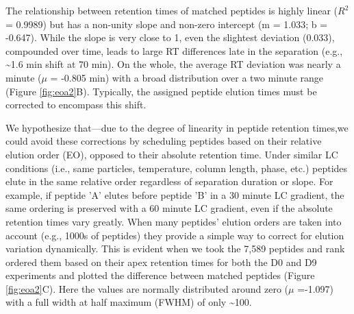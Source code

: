 The relationship between retention times of matched peptides is highly linear ($R^2$ = 0.9989) but has a non-unity slope and non-zero intercept (m = 1.033; b = -0.647). While the slope is very close to 1, even the slightest deviation (0.033), compounded over time, leads to large RT differences late in the separation (e.g., \textasciitilde1.6 min shift at 70 min). On the whole, the average RT deviation was nearly a minute ($\mu$ = -0.805 min) with a broad distribution over a two minute range (Figure \ref{fig:eoa2}B). Typically, the assigned peptide elution times must be corrected to encompass this shift.

We hypothesize that---due to the degree of linearity in peptide retention times,we could avoid these corrections by scheduling peptides based on their relative elution order (EO), opposed to their absolute retention time. Under similar LC conditions (i.e., same particles, temperature, column length, phase, etc.) peptides elute in the same relative order regardless of separation duration or slope. For example, if peptide 'A' elutes before peptide 'B' in a 30 minute LC gradient, the same ordering is preserved with a 60 minute LC gradient, even if the absolute retention times vary greatly. When many peptides' elution orders are taken into account (e.g., 1000s of peptides) they provide a simple way to correct for elution variation dynamically. This is evident when we took the 7,589 peptides and rank ordered them based on their apex retention times for both the D0 and D9 experiments and plotted the difference between matched peptides (Figure \ref{fig:eoa2}C). Here the values are normally distributed around zero ($\mu$ =-1.097) with a full width at half maximum (FWHM) of only \textasciitilde100.
